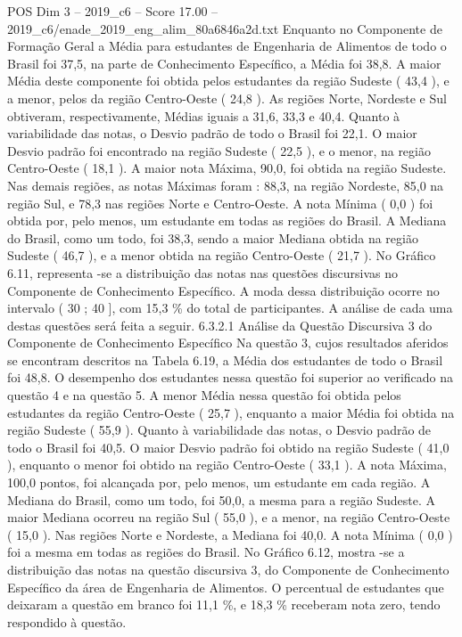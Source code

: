 \begin{textsample}{POS Dim 3 – 2019\_c6 – Score 17.00 – 2019\_c6/enade\_2019\_eng\_alim\_80a6846a2d.txt}
Enquanto no Componente de Formação Geral a Média para estudantes de Engenharia de Alimentos de todo o Brasil foi 37,5, na parte de Conhecimento Específico, a Média foi 38,8.
A maior Média deste componente foi obtida pelos estudantes da região Sudeste ( 43,4 ), e a menor, pelos da região Centro-Oeste ( 24,8 ).
As regiões Norte, Nordeste e Sul obtiveram, respectivamente, Médias iguais a 31,6, 33,3 e 40,4.
Quanto à variabilidade das notas, o Desvio padrão de todo o Brasil foi 22,1.
O maior Desvio padrão foi encontrado na região Sudeste ( 22,5 ), e o menor, na região Centro-Oeste ( 18,1 ).
A maior nota Máxima, 90,0, foi obtida na região Sudeste.
Nas demais regiões, as notas Máximas foram : 88,3, na região Nordeste, 85,0 na região Sul, e 78,3 nas regiões Norte e Centro-Oeste.
A nota Mínima ( 0,0 ) foi obtida por, pelo menos, um estudante em todas as regiões do Brasil.
A Mediana do Brasil, como um todo, foi 38,3, sendo a maior Mediana obtida na região Sudeste ( 46,7 ), e a menor obtida na região Centro-Oeste ( 21,7 ).
No Gráfico 6.11, representa -se a distribuição das notas nas questões discursivas no Componente de Conhecimento Específico.
A moda dessa distribuição ocorre no intervalo ( 30 ; 40 ], com 15,3 \% do total de participantes.
A análise de cada uma destas questões será feita a seguir. 6.3.2.1 Análise da Questão Discursiva 3 do Componente de Conhecimento Específico Na questão 3, cujos resultados aferidos se encontram descritos na Tabela 6.19, a Média dos estudantes de todo o Brasil foi 48,8.
O desempenho dos estudantes nessa questão foi superior ao verificado na questão 4 e na questão 5.
A menor Média nessa questão foi obtida pelos estudantes da região Centro-Oeste ( 25,7 ), enquanto a maior Média foi obtida na região Sudeste ( 55,9 ).
Quanto à variabilidade das notas, o Desvio padrão de todo o Brasil foi 40,5.
O maior Desvio padrão foi obtido na região Sudeste ( 41,0 ), enquanto o menor foi obtido na região Centro-Oeste ( 33,1 ).
A nota Máxima, 100,0 pontos, foi alcançada por, pelo menos, um estudante em cada região.
A Mediana do Brasil, como um todo, foi 50,0, a mesma para a região Sudeste.
A maior Mediana ocorreu na região Sul ( 55,0 ), e a menor, na região Centro-Oeste ( 15,0 ).
Nas regiões Norte e Nordeste, a Mediana foi 40,0.
A nota Mínima ( 0,0 ) foi a mesma em todas as regiões do Brasil.
No Gráfico 6.12, mostra -se a distribuição das notas na questão discursiva 3, do Componente de Conhecimento Específico da área de Engenharia de Alimentos.
O percentual de estudantes que deixaram a questão em branco foi 11,1 \%, e 18,3 \% receberam nota zero, tendo respondido à questão.

\end{textsample}
